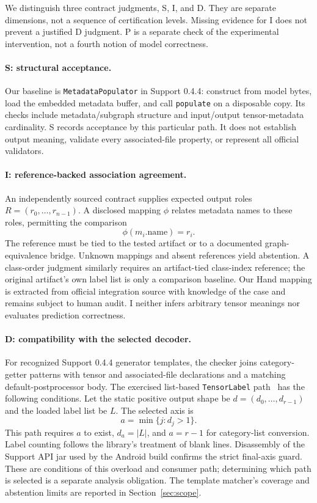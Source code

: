 \documentclass[10pt,twocolumn,letterpaper]{article}
\newcommand{\code}[1]{\texttt{#1}}
\begin{document}
We distinguish three contract judgments, S, I, and D. They are separate dimensions, not a sequence of certification levels. Missing evidence for I does not prevent a justified D judgment. P is a separate check of the experimental intervention, not a fourth notion of model correctness.

\paragraph{S: structural acceptance.}
Our baseline is \code{MetadataPopulator} in Support 0.4.4: construct from model bytes, load the embedded metadata buffer, and call \code{populate} on a disposable copy. Its checks include metadata/subgraph structure and input/output tensor-metadata cardinality. S records acceptance by this particular path. It does not establish output meaning, validate every associated-file property, or represent all official validators.

\paragraph{I: reference-backed association agreement.}
An independently sourced contract supplies expected output roles $R=(r_0,\ldots,r_{n-1})$. A disclosed mapping $\phi$ relates metadata names to these roles, permitting the comparison
\begin{equation}
\phi(m_i.\mathrm{name})=r_i.
\end{equation}
The reference must be tied to the tested artifact or to a documented graph-equivalence bridge. Unknown mappings and absent references yield abstention. A class-order judgment similarly requires an artifact-tied class-index reference; the original artifact's own label list is only a comparison baseline. Our Hand mapping is extracted from official integration source with knowledge of the case and remains subject to human audit. I neither infers arbitrary tensor meanings nor evaluates prediction correctness.

\paragraph{D: compatibility with the selected decoder.}
For recognized Support 0.4.4 generator templates, the checker joins category-getter patterns with tensor and associated-file declarations and a matching default-postprocessor body. The exercised list-based \code{TensorLabel} path~\cite{tensorlabel} has the following conditions. Let the static positive output shape be $d=(d_0,\ldots,d_{r-1})$ and the loaded label list be $L$. The selected axis is
\begin{equation}
a=\min\{j:d_j>1\}.
\end{equation}
This path requires $a$ to exist, $d_a=|L|$, and $a=r-1$ for category-list conversion. Label counting follows the library's treatment of blank lines. Disassembly of the Support API jar used by the Android build confirms the strict final-axis guard. These are conditions of this overload and consumer path; determining which path is selected is a separate analysis obligation. The template matcher's coverage and abstention limits are reported in Section~\ref{sec:scope}.
\end{document}
